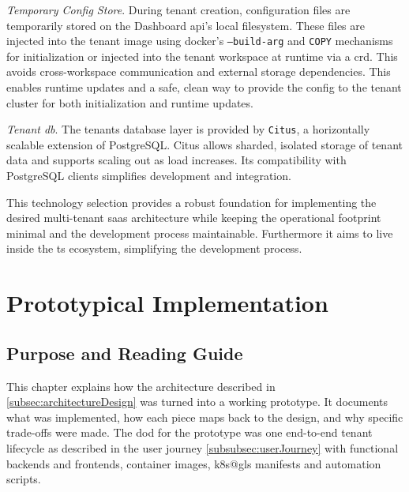 \documentclass[11pt, a4paper, oneside, listof=totoc]{scrartcl}
\begin{document}
\begin{enumerate}[label={[\arabic*]:},
                ref=Challenge~\arabic*,
                leftmargin=*,
                itemsep=0.6\baselineskip]
                \item\label{chal:tempConfigStore}
                    \textit{Temporary Config Store}.
                    During tenant creation, configuration files are temporarily stored on the
                    Dashboard \gls{api}'s local filesystem.
                    These files are injected into the tenant image using \gls{docker}'s
                    \texttt{--build-arg} and \texttt{COPY} mechanisms for initialization or
                    injected into the tenant workspace at runtime via a \gls{crd}.
                    This avoids cross-workspace communication and external storage dependencies.
                    This enables runtime updates and a safe, clean way to provide the config to the
                    tenant cluster for both initialization and runtime updates.

                \item\label{chal:tenantDB2}
                    \textit{Tenant \gls{db}}.
                    The tenants database layer is provided by \texttt{Citus}, a horizontally
                    scalable extension of PostgreSQL.\@
                    Citus allows sharded, isolated storage of tenant data and supports scaling out
                    as load increases.
                    Its compatibility with PostgreSQL clients simplifies development and
                    integration.

            \end{enumerate}

            This technology selection provides a robust foundation for implementing the desired
            multi-tenant \gls{saas} architecture while keeping the operational footprint minimal and
            the development process maintainable.
            Furthermore it aims to live inside the \gls{ts} ecosystem, simplifying the development
            process.

    \clearpage

    \section{Prototypical Implementation}\label{sec:prototype}

        \subsection{Purpose and Reading Guide}\label{subsec:purposeAndReadingGuide}
            This chapter explains how the architecture described in
            \autoref{subsec:architectureDesign} was turned into a working prototype.
            It documents what was implemented, how each piece maps back to the design, and why
            specific trade-offs were made.
            The \gls{dod} for the prototype was one end-to-end tenant lifecycle as described in
            the user journey \autoref{subsubsec:userJourney} with functional backends and frontends,
            container images, \gls{k8s@gls} manifests and automation scripts.
\end{document}

